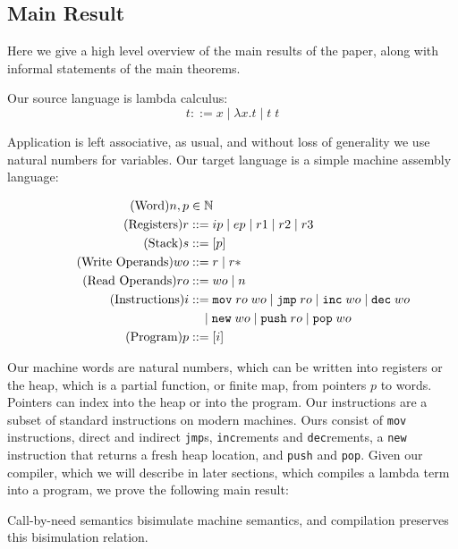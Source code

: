 \subsection{Main Result}
Here we give a high level overview of the main results of the paper, along with
informal statements of the main theorems.

Our source language is lambda calculus: 
$$ t ::= x \; | \; \lambda x.t \; | \; t \; t $$

Application is left associative, as usual, and without loss of generality we
use natural numbers for variables. Our target language is a simple machine
assembly language:

\begin{align}
  \tag{Word}   n, p &\in \mathbb{N} \\
  \tag{Registers} r &::= ip \; | \; ep \; | \; r1 \; | \; r2 \; | \; r3 \\
  \tag{Stack}     s &::= [p] \\
  \tag{Write Operands}  wo &::= r \; | \; r* \\
  \tag{Read Operands}  ro &::= wo \; | \; n \\
  \tag{Instructions} i &::= \texttt{mov} \; ro \; wo \; 
                       | \; \texttt{jmp} \; ro \; 
                       | \; \texttt{inc} \; wo \;
                       | \; \texttt{dec} \; wo \; \\
  \notag    & \quad \; | \; \texttt{new} \; wo \;
                       | \; \texttt{push} \; ro \; 
                       | \; \texttt{pop} \; wo \\
  \tag{Program}   p &::= [i]
\end{align}

Our machine words are natural numbers, which can be written into registers or
the heap, which is a partial function, or finite map, from pointers $p$ to
words. Pointers can index into the heap or into the program. Our instructions
are a subset of standard instructions on modern machines. Ours consist of
\texttt{mov} instructions, direct and indirect \texttt{jmp}s, \texttt{inc}rements
and \texttt{dec}rements, a \texttt{new} instruction that returns a fresh heap
location, and \texttt{push} and \texttt{pop}.  Given our compiler, which we will
describe in later sections, which compiles a lambda term into a program, we
prove the following main result:

\begin{theorem}
Call-by-need semantics bisimulate machine semantics, and compilation
preserves this bisimulation relation.
\end{theorem}

